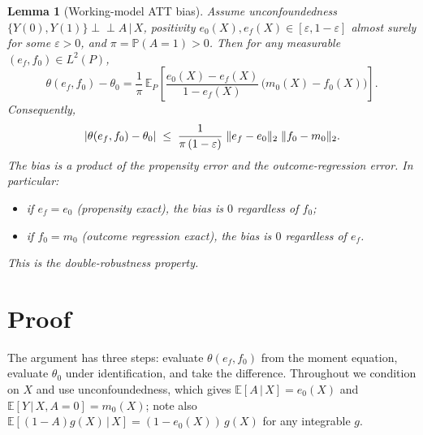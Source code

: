 \documentclass[11pt]{article}
\theoremstyle{plain}
\newtheorem{lemma}{Lemma}
\theoremstyle{remark}
\newcommand{\E}{\mathbb{E}}
\newcommand{\PP}{\mathbb{P}}
\newcommand{\indep}{\perp\!\!\!\perp}
\newcommand{\given}{\,\vert\,}
\newcommand{\ef}{e_f}
\newcommand{\ez}{e_0}
\newcommand{\mz}{m_0}
\newcommand{\fz}{f_0}
\newcommand{\Ltwo}[1]{\lVert #1 \rVert_{2}}
\DeclarePairedDelimiter{\abs}{\lvert}{\rvert}
\begin{document}
\begin{lemma}[Working-model ATT bias]\label{lem:bias}
Assume unconfoundedness $\{Y(0), Y(1)\} \indep A \given X$, positivity
$\ez(X), \ef(X) \in [\varepsilon, 1 - \varepsilon]$ almost surely for some
$\varepsilon > 0$, and $\pi = \PP(A = 1) > 0$. Then for any measurable
$(\ef, \fz) \in L^2(P)$,
\begin{equation}\label{eq:bias-formula}
  \boxed{\;
  \theta(\ef, \fz) - \theta_0
  = \frac{1}{\pi}\,
    \E_P\!\left[
      \frac{\ez(X) - \ef(X)}{1 - \ef(X)}\,
      \bigl(\mz(X) - \fz(X)\bigr)
    \right].
  \;}
\end{equation}
Consequently,
\begin{equation}\label{eq:bias-bound}
  \abs{\theta(\ef, \fz) - \theta_0}
  \;\le\;
  \frac{1}{\pi\,(1 - \varepsilon)}\;
  \Ltwo{\ef - \ez}\;\Ltwo{\fz - \mz}.
\end{equation}
The bias is a \emph{product} of the propensity error and the outcome-regression
error. In particular:
\begin{itemize}
  \item if $\ef = \ez$ (propensity exact), the bias is $0$ regardless of $\fz$;
  \item if $\fz = \mz$ (outcome regression exact), the bias is $0$ regardless of $\ef$.
\end{itemize}
This is the double-robustness property.
\end{lemma}


\section{Proof}

The argument has three steps: evaluate $\theta(\ef, \fz)$ from the moment
equation, evaluate $\theta_0$ under identification, and take the difference.
Throughout we condition on $X$ and use unconfoundedness, which gives
$\E[A \given X] = \ez(X)$ and $\E[Y \given X, A = 0] = \mz(X)$; note also
$\E[(1-A)g(X) \given X] = (1 - \ez(X))\,g(X)$ for any integrable $g$.
\end{document}
